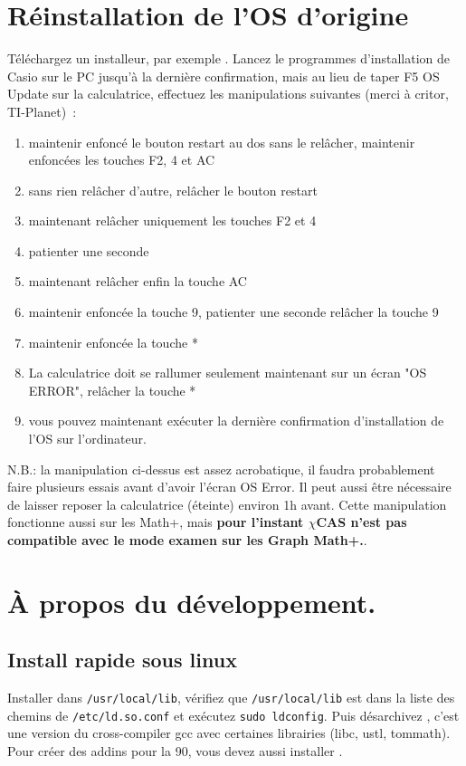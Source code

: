 \documentclass{article}
\begin{document}
\begin{giacjshere}
\section{Réinstallation de l'OS d'origine} \label{sec:oserror}
Téléchargez un installeur, par exemple
.
Lancez le programmes
d'installation de Casio sur le PC jusqu'à la dernière confirmation,
mais au lieu de taper F5 OS Update sur la calculatrice,
effectuez les manipulations suivantes (merci à critor, TI-Planet)~:
\begin{enumerate}
     \item maintenir enfoncé le bouton restart    au dos
    sans le relâcher, maintenir enfoncées les touches
    F2,   4 et    AC
\item
  sans rien relâcher d'autre, relâcher le bouton restart
  \item
    maintenant relâcher uniquement les touches
    F2 et    4
\item
  patienter une seconde
  \item
    maintenant relâcher enfin la touche    AC
\item
    maintenir enfoncée la touche    9,
    patienter une seconde
    relâcher la touche    9
\item
    maintenir enfoncée la touche *
\item
  La calculatrice doit se rallumer seulement maintenant
  sur un écran "OS ERROR",  relâcher la touche *
\item vous pouvez maintenant exécuter la dernière confirmation
  d'installation de l'OS sur l'ordinateur.
\end{enumerate}
N.B.: la manipulation ci-dessus est assez acrobatique, il faudra probablement
faire plusieurs essais avant d'avoir l'écran OS Error.
Il peut aussi être nécessaire de laisser reposer la calculatrice (éteinte)
environ 1h avant.
Cette manipulation fonctionne aussi sur les Math+, mais
{\bf pour l'instant $\chi$CAS n'est
pas compatible avec le mode examen sur les Graph Math+.}.

\section{\`A propos du d\'eveloppement.} \label{sec:dev}
\subsection{Install rapide sous linux} 
Installer
 dans \verb|/usr/local/lib|,
v\'erifiez que \verb|/usr/local/lib| est dans la liste des chemins de
\verb|/etc/ld.so.conf| 
et ex\'ecutez
\verb|sudo ldconfig|. Puis d\'esarchivez
,
c'est une version du cross-compiler gcc avec certaines librairies
(libc, ustl, tommath). Pour cr\'eer des addins pour la 90, vous devez aussi installer 
.


\end{giacjshere}
\end{document}
